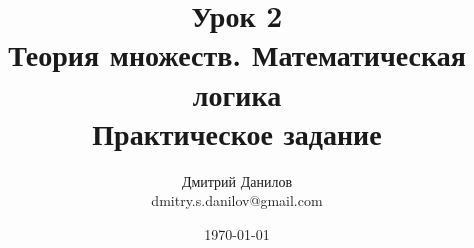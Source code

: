 \documentclass{article}
\begin{document}
\title{Урок 2 \\ Теория множеств. Математическая логика \\ Практическое задание}
\author{Дмитрий Данилов \\ dmitry.s.danilov@gmail.com}
\date{\today}
\maketitle


%



%
\end{document}
